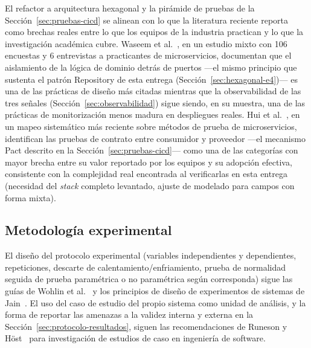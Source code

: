El refactor a arquitectura hexagonal y la pirámide de pruebas de la Sección~\ref{sec:pruebas-cicd}
se alinean con lo que la literatura reciente reporta como brechas reales entre lo que los equipos
de la industria practican y lo que la investigación académica cubre. Waseem et
al.~\cite{waseem2021microservices}, en un estudio mixto con 106 encuestas y 6 entrevistas a
practicantes de microservicios, documentan que el aislamiento de la lógica de dominio detrás de
puertos —el mismo principio que sustenta el patrón Repository de esta entrega
(Sección~\ref{sec:hexagonal-e4})— es una de las prácticas de diseño más citadas mientras que la
observabilidad de las tres señales (Sección~\ref{sec:observabilidad}) sigue siendo, en su muestra,
una de las prácticas de monitorización menos madura en despliegues reales. Hui et
al.~\cite{hui2025microservices}, en un mapeo sistemático más reciente sobre métodos de prueba de
microservicios, identifican las pruebas de contrato entre consumidor y proveedor —el mecanismo
Pact descrito en la Sección~\ref{sec:pruebas-cicd}— como una de las categorías con mayor brecha
entre su valor reportado por los equipos y su adopción efectiva, consistente con la complejidad
real encontrada al verificarlas en esta entrega (necesidad del \emph{stack} completo levantado,
ajuste de modelado para campos con forma mixta).

\subsection{Metodología experimental}

El diseño del protocolo experimental (variables independientes y dependientes, repeticiones,
descarte de calentamiento/enfriamiento, prueba de normalidad seguida de prueba paramétrica o no
paramétrica según corresponda) sigue las guías de Wohlin et al.~\cite{wohlin2012experimentation}
y los principios de diseño de experimentos de sistemas de Jain~\cite{jain1991art}. El uso del caso
de estudio del propio sistema como unidad de análisis, y la forma de reportar las amenazas a la
validez interna y externa en la Sección~\ref{sec:protocolo-resultados}, siguen las recomendaciones
de Runeson y Höst~\cite{runeson2009guidelines} para investigación de estudios de caso en ingeniería
de software.
